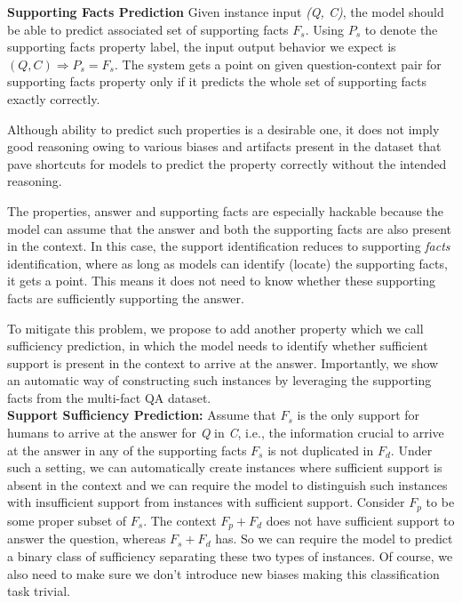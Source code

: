 {\noindent \textbf{Supporting Facts Prediction} Given instance input {\it (Q, C)}, the model should be able to predict associated set of supporting facts $F_s$. Using $P_s$ to denote the supporting facts property label, the input output behavior we expect is $(Q, C) \Rightarrow P_s{=}F_s$. The system gets a point on given question-context pair for supporting facts property only if it predicts the whole set of supporting facts exactly correctly.

Although ability to predict such properties is a desirable one, it does not imply good reasoning owing to various biases and artifacts present in the dataset that pave shortcuts for models to predict the property correctly without the intended reasoning. 

The properties, answer and supporting facts are especially hackable because the model can assume that the answer and both the supporting facts are also present in the context. In this case, the support identification reduces to supporting \textit{facts} identification, where as long as models can identify (locate) the supporting facts, it gets a point. This means it does not need to know whether these supporting facts are sufficiently supporting the answer. 

To mitigate this problem, we propose to add another property which we call sufficiency prediction, in which the model needs to identify whether sufficient support is present in the context to arrive at the answer. Importantly, we show an automatic way of constructing such instances by leveraging the supporting facts from the multi-fact QA dataset. \\

\noindent \textbf{Support Sufficiency Prediction:} Assume that $F_s$ is the only support for humans to arrive at the answer for {\it Q} in {\it C}, i.e., the information crucial to arrive at the answer in any of the supporting facts $F_s$ is not duplicated in $F_d$. Under such a setting, we can automatically create instances where sufficient support is absent in the context and we can require the model to distinguish such instances with insufficient support from instances with sufficient support. Consider $F_p$ to be some proper subset of $F_s$. The context $F_p + F_d$ does not have sufficient support to answer the question, whereas $F_s + F_d$ has. So we can require the model to predict a binary class of sufficiency separating these two types of instances. Of course, we also need to make sure we don't introduce new biases making this classification task trivial.

}
